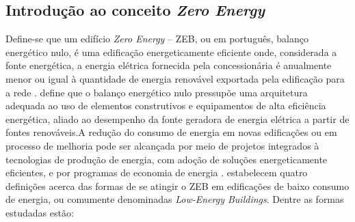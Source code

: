 \subsection{Introdução ao conceito \textit{Zero Energy}}
Define-se que um edifício \textit{Zero Energy} – ZEB, ou em português, balanço 
energético nulo, é uma edificação  energeticamente  eficiente  onde,  
considerada  a  fonte  energética,  a  energia  elétrica fornecida pela 
concessionária é anualmente menor ou igual à quantidade de energia renovável 
exportada pela edificação para a rede 
\cite{Torcellini2006,U.S.DepartmentofEnergy-USDOE2012,U.S.DepartmentofEnergy-USDOE2015}.\vspace*{0.3cm} \newline
\textcite{Domingos2014} define  que  o  balanço  energético  nulo  pressupõe  
uma  arquitetura adequada ao uso de elementos construtivos e equipamentos 
de alta eficiência energética, aliado ao desempenho da fonte geradora de 
energia elétrica a partir de fontes renováveis.\newline A redução do consumo de 
energia em novas edificações ou em processo de melhoria pode ser alcançada 
por meio de projetos integrados à tecnologias de produção de energia, com 
adoção de soluções   energeticamente   eficientes,   e   por   programas   
de   economia   de   energia \cite{U.S.DepartmentofEnergy-USDOE2015}.\vspace*{0.3cm} \newline
\textcite{Torcellini2006} estabelecem quatro definições acerca das formas de 
se atingir o ZEB em edificações  de  baixo  consumo  de  energia,  ou  
comumente  denominadas \textit{Low-Energy Buildings}. Dentre as formas estudadas estão: 
